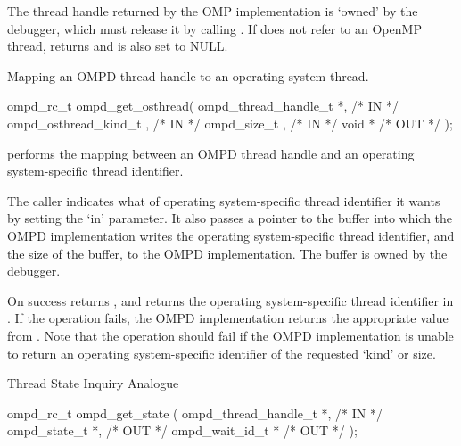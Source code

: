 The thread handle  returned by the OMP implementation
is `owned' by the debugger, which must release it by calling
.
If  does not refer to an OpenMP thread,
 returns 
and  is also set to NULL.
\crossreferences


\summary
Mapping an OMPD thread handle to an operating system thread.
\format
\ccppspecificstart
\begin{boxedcode}
ompd\_rc\_t ompd\_get\_osthread(
  ompd\_thread\_handle\_t *,                             /* IN */
  ompd\_osthread\_kind\_t ,                                      /* IN */
  ompd\_size\_t ,                           /* IN */
  void  *                                  /* OUT */
);
\end{boxedcode}
\ccppspecificend

\descr
{} performs the mapping between an OMPD
thread handle and an operating system-specific thread identifier.

\argdesc
The caller indicates what  of operating system-specific thread
identifier it wants by setting the 
`in' parameter.
It also passes a pointer to the buffer into which the OMPD
implementation writes the operating system-specific thread identifier,
and the size of the buffer, to the OMPD implementation.
The buffer is owned by the debugger.

On success  returns ,
and returns the operating system-specific thread identifier in
.
If the operation fails, the OMPD implementation returns
the appropriate value from .
Note that the operation should fail if the OMPD implementation is
unable to return an operating system-specific identifier of the
requested `kind' or size.

\crossreferences



\summary
Thread State Inquiry Analogue
\format
\ccppspecificstart
\begin{boxedcode}
ompd\_rc\_t ompd\_get\_state (
  ompd\_thread\_handle\_t *,                             /* IN */
  ompd\_state\_t *,                                    /* OUT */
  ompd\_wait\_id\_t    *                                   /* OUT */
);
\end{boxedcode}
\ccppspecificend


